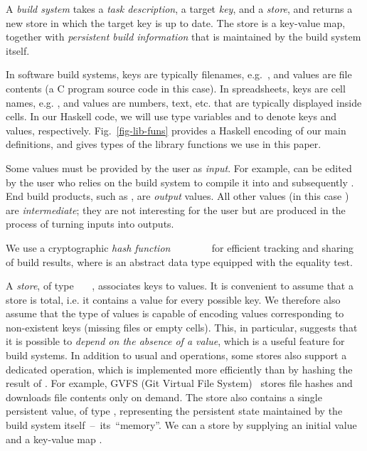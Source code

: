 A \emph{build system} takes a \emph{task description}, a target \emph{key},
and a \emph{store}, and returns a new store in which the target key is
up to date. The store is a key-value map, together with \emph{persistent build
information} that is maintained by the build system itself.

In software build systems, keys are typically filenames,
e.g.~, and values are file contents (a C program source
code in this case). In spreadsheets, keys are cell names,
e.g. , and values are numbers, text, etc. that are typically
displayed inside cells. In our Haskell code, we will use type
variables  and  to denote keys and values, respectively.
Fig.~\ref{fig-lib-funs} provides a Haskell encoding of our main definitions,
and gives types of the library functions we use in this paper.

Some values must be provided by the user as \emph{input}. For example,
 can be edited by the user who relies on the build system to
compile it into  and subsequently . End build products,
such as , are \emph{output} values. All other values (in this case
) are \emph{intermediate}; they are not interesting for the user
but are produced in the process of turning inputs into outputs.

We use a cryptographic \emph{hash function}
~\hs{::}~~~\hs{=>}~~\hs{->}~ for
efficient tracking and sharing of build results, where  is an abstract
data type equipped with the equality test.

A \emph{store}, of type ~~~, associates keys to
values. It is convenient to assume that a store is total, i.e. it contains a
value for every possible key. We therefore also assume that the type of values
is capable of encoding values corresponding to non-existent keys (missing files
or empty cells). This, in particular, suggests that it is possible to
\emph{depend on the absence of a value}, which is a useful feature for build
systems. In addition to usual  and  operations, some
stores also support a dedicated  operation, which is implemented
more efficiently than by hashing the result of . For example, GVFS
(Git Virtual File System)~\cite{gvfs} stores file hashes and downloads file
contents only on demand. The store also contains a single persistent value, of
type , representing the persistent state maintained by the build system
itself~--~its~``memory''. We can  a store by supplying an initial
value  and a key-value map \store.

